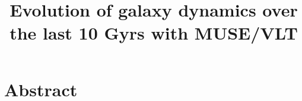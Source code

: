 \documentclass[a4paper, twoside, 12pt]{article}
\title{Evolution of galaxy dynamics over the last 10 Gyrs with MUSE/VLT}
\begin{document}


\clearpage
\thispagestyle{empty}
\section*{Abstract}



\clearpage
{}
\tableofcontents
\clearpage
\listoffigures
\clearpage
\listoftables
\clearpage









\clearpage
\renewcommand*{\thesection}{}\textbf{}

\def\bibfont{\small}





\appendix
\renewcommand*{\thesection}{\Alph{section}}\textbf{}


\end{document}
